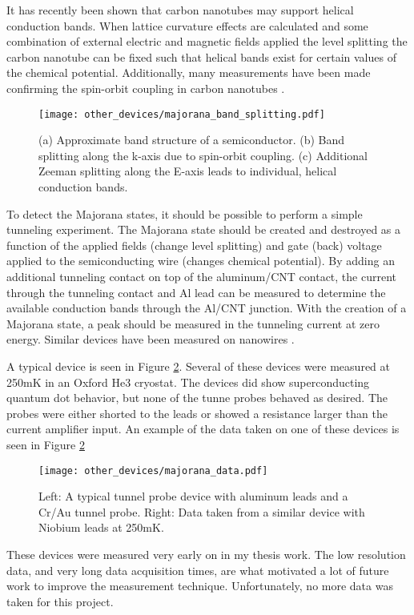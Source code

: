 It has recently been shown that carbon nanotubes may support helical conduction bands\cite{Klinovaja2011a, Klinovaja2011}.  When lattice curvature effects are calculated and some combination of external electric and magnetic fields applied the level splitting the carbon nanotube can be fixed such that helical bands exist for certain values of the chemical potential. Additionally, many measurements have been made confirming the spin-orbit coupling in carbon nanotubes \cite{Kuemmeth2008, Jespersen2011, Steele2013 ,Lai2014}.

\begin{figure}
    \centering
    \texttt{[image: other\_devices/majorana\_band\_splitting.pdf]}
    \caption{(a) Approximate band structure of a semiconductor. (b) Band splitting along the k-axis due to spin-orbit coupling. (c) Additional Zeeman splitting along the E-axis leads to individual, helical conduction bands.}
    \label{fig:band_splitting}
\end{figure}

To detect the Majorana states, it should be possible to perform a simple tunneling experiment. The Majorana state should be created and destroyed as a function of the applied fields (change level splitting) and gate (back) voltage applied to the semiconducting wire (changes chemical potential). By adding an additional tunneling contact on top of the aluminum/CNT contact, the current through the tunneling contact and Al lead can be measured to determine the available conduction bands through the Al/CNT junction. With the creation of a Majorana state, a peak should be measured in the tunneling current at zero energy. Similar devices have been measured on  nanowires \cite{Mourik2012}. 

A typical device is seen in Figure \ref{fig:majorana_data}. Several of these devices were measured at 250mK in an Oxford He3 cryostat. The devices did show superconducting quantum dot behavior, but none of the tunne probes behaved as desired. The probes were either shorted to the leads or showed a resistance larger than the current amplifier input. An example of the data taken on one of these devices is seen in Figure \ref{fig:majorana_data}

\begin{figure}
    \centering
    \texttt{[image: other\_devices/majorana\_data.pdf]}
    \caption{Left: A typical tunnel probe device with aluminum leads and a Cr/Au tunnel probe. Right: Data taken from a similar device with Niobium leads at 250mK.}
    \label{fig:majorana_data}
\end{figure}

These devices were measured very early on in my thesis work. The low resolution data, and very long data acquisition times, are what motivated a lot of future work to improve the measurement technique. Unfortunately, no more data was taken for this project.